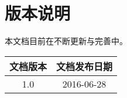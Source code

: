 {\section*{版本说明}}

本文档目前在不断更新与完善中。

\begin{table}[H]
\centering
\begin{tabular}{cc}
\toprule
文档版本    &   文档发布日期    \\
\midrule
1.0         &   2016-06-28    \\

\bottomrule
\end{tabular}
\end{table}
